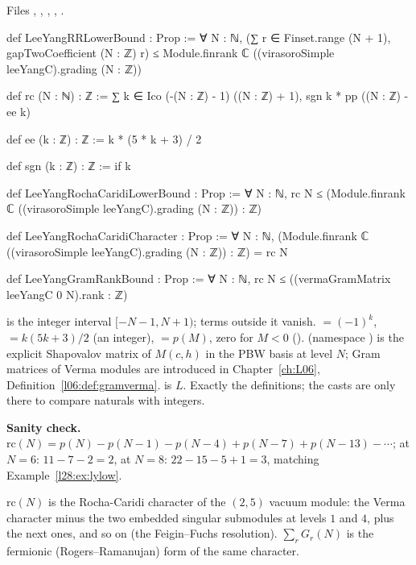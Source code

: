 \noindent Files , ,
, , .
\begin{leancode}
def LeeYangRRLowerBound : Prop :=
  ∀ N : ℕ, (∑ r ∈ Finset.range (N + 1), gapTwoCoefficient (N : ℤ) r) ≤
    Module.finrank ℂ ((virasoroSimple leeYangC).grading (N : ℤ))

def rc (N : ℕ) : ℤ := ∑ k ∈ Ico (-(N : ℤ) - 1) ((N : ℤ) + 1), sgn k * pp ((N : ℤ) - ee k)

def ee (k : ℤ) : ℤ := k * (5 * k + 3) / 2

def sgn (k : ℤ) : ℤ := if k %

def LeeYangRochaCaridiLowerBound : Prop :=
  ∀ N : ℕ, rc N ≤ (Module.finrank ℂ ((virasoroSimple leeYangC).grading (N : ℤ)) : ℤ)

def LeeYangRochaCaridiCharacter : Prop :=
  ∀ N : ℕ, (Module.finrank ℂ ((virasoroSimple leeYangC).grading (N : ℤ)) : ℤ) = rc N

def LeeYangGramRankBound : Prop :=
  ∀ N : ℕ, rc N ≤ ((vermaGramMatrix leeYangC 0 N).rank : ℤ)
\end{leancode}

\begin{dictionary}
 is the integer interval $[-N-1,N+1)$; terms outside it vanish. $=(-1)^k$, $=k(5k+3)/2$ (an integer),
$=p(M)$, zero for $M<0$ ().  (namespace ) is the explicit Shapovalov matrix of $M(c,h)$ in the PBW
basis at level $N$; Gram matrices of Verma modules are introduced in Chapter~\ref{ch:L06}, Definition~\ref{l06:def:gramverma}.  is $L$. Exactly the
definitions; the casts  are only there to compare naturals with integers.

\textbf{Sanity check.} $\mathrm{rc}(N)=p(N)-p(N-1)-p(N-4)+p(N-7)+p(N-13)-\cdots$; at $N=6$: $11-7-2=2$, at $N=8$: $22-15-5+1=3$, matching Example~\ref{l28:ex:lylow}.
\end{dictionary}

\begin{physics}
$\mathrm{rc}(N)$ is the Rocha-Caridi character of the $(2,5)$ vacuum module: the Verma character minus the two embedded singular submodules at levels $1$ and $4$,
plus the next ones, and so on (the Feigin--Fuchs resolution). $\sum_rG_r(N)$ is the fermionic (Rogers--Ramanujan) form of the same character.
\end{physics}

